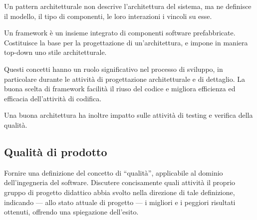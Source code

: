 Un pattern architetturale non descrive l'architettura del sistema, ma ne
definisce il modello, il tipo di componenti, le loro interazioni i vincoli su
esse.

Un framework è un insieme integrato di componenti software prefabbricate.
Costituisce la base per la progettazione  di
un'architettura, e impone in maniera top-down uno stile architetturale.

Questi concetti hanno un ruolo significativo nel processo di sviluppo, in
particolare durante le attività di progettazione architetturale e di dettaglio.
La buona scelta di framework facilità il riuso del codice e migliora
efficienza ed efficacia dell'attività di codifica.

Una buona architettura ha inoltre impatto sulle attività di testing e verifica
della qualità.

\subsection{Qualità di prodotto}
\label{sub:qualit_di_prodotto}

\begin{question}
  Fornire una definizione del concetto di ``qualità'', applicabile al dominio
  dell'ingegneria del software. Discutere concisamente quali attività il proprio
  gruppo di progetto didattico abbia svolto nella direzione di tale definizione,
  indicando --- allo stato attuale di progetto --- i migliori e i peggiori
  risultati ottenuti, offrendo una spiegazione dell'esito.
\end{question}
